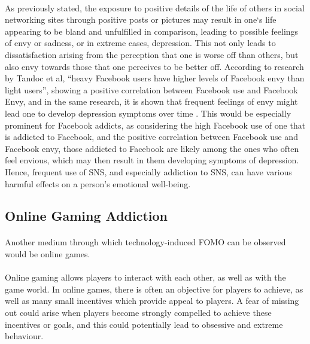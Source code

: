     \paragraph{}
      As previously stated, the exposure to positive details of the life of others in social networking sites through positive posts or pictures may result in one`s life appearing to be bland and unfulfilled in comparison, leading to possible feelings of envy or sadness, or in extreme cases, depression. This not only leads to dissatisfaction arising from the perception that one is worse off than others, but also envy towards those that one perceives to be better off. According to research by Tandoc et al, “heavy Facebook users have higher levels of Facebook envy than light users”, showing a positive correlation between Facebook use and Facebook Envy, and in the same research, it is shown that frequent feelings of envy might lead one to develop depression symptoms over time \cite{tandoc2015facebook}. This would be especially prominent for Facebook addicts, as considering the high Facebook use of one that is addicted to Facebook, and the positive correlation between Facebook use and Facebook envy, those addicted to Facebook are likely among the ones who often feel envious, which may then result in them developing symptoms of depression. Hence, frequent use of SNS, and especially addiction to SNS, can have various harmful effects on a person’s emotional well-being.
  
  
  \subsection{Online Gaming Addiction}
    \paragraph{}
      Another medium through which technology-induced FOMO can be observed would be online games.
    \paragraph{}
      Online gaming allows players to interact with each other, as well as with the game world. In online games, there is often an objective for players to achieve, as well as many small incentives which provide appeal to players. A fear of missing out could arise when players become strongly compelled to achieve these incentives or goals, and this could potentially lead to obsessive and extreme behaviour.
